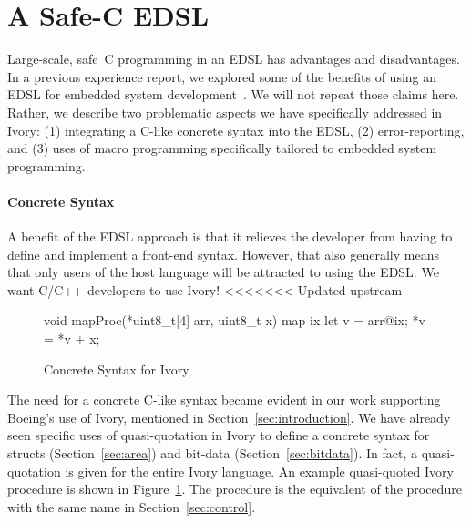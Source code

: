 \section{A Safe-C EDSL}
\label{sec:edsl}

Large-scale, safe~C programming in an EDSL has advantages and disadvantages. In
a previous experience report, we explored some of the benefits of using an EDSL
for embedded system development~\cite{smaccm}. We will not repeat those claims
here. Rather, we describe two problematic aspects we have specifically addressed
in Ivory: (1) integrating a C-like concrete syntax into the EDSL, (2)
error-reporting, and (3) uses of macro programming specifically tailored to
embedded system programming.

\paragraph{Concrete Syntax}

A benefit of the EDSL approach is that it relieves the developer from having to
define and implement a front-end syntax. However, that also generally means that
only users of the host language will be attracted to using the
EDSL. We want C/C++ developers to use Ivory!
<<<<<<< Updated upstream

\begin{figure}[h!]
\begin{code}
void mapProc(*uint8_t[4] arr, uint8_t x) {
  map ix {
    let v = arr@ix;
    *v = *v + x;
  }
}
\end{code}
  \caption{Concrete Syntax for Ivory}
  \label{fig:concrete}
\end{figure}


The need for a concrete C-like syntax became evident in our work supporting
Boeing's use of Ivory, mentioned in Section~\ref{sec:introduction}. We have
already seen specific uses of quasi-quotation in Ivory to define a concrete
syntax for structs (Section~\ref{sec:area}) and bit-data
(Section~\ref{sec:bitdata}). In fact, a quasi-quotation is given for the entire
Ivory language. An example quasi-quoted Ivory procedure is shown in
Figure~\ref{fig:concrete}. The procedure is the equivalent of the procedure with
the same name in Section~\ref{sec:control}.

